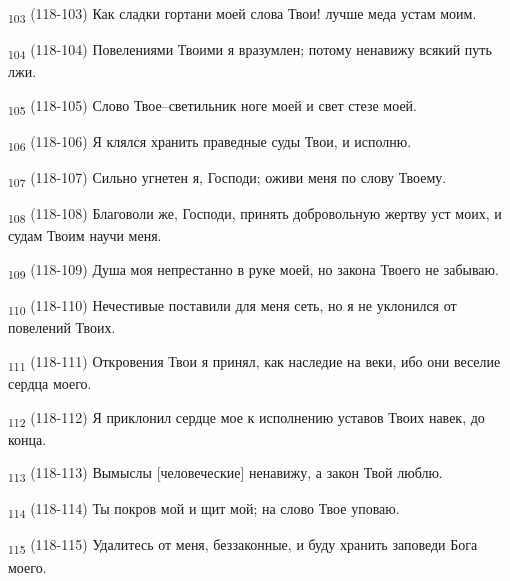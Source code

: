 \begin{tcolorbox}
\textsubscript{103} (118-103) Как сладки гортани моей слова Твои! лучше меда устам моим.
\end{tcolorbox}
\begin{tcolorbox}
\textsubscript{104} (118-104) Повелениями Твоими я вразумлен; потому ненавижу всякий путь лжи.
\end{tcolorbox}
\begin{tcolorbox}
\textsubscript{105} (118-105) Слово Твое--светильник ноге моей и свет стезе моей.
\end{tcolorbox}
\begin{tcolorbox}
\textsubscript{106} (118-106) Я клялся хранить праведные суды Твои, и исполню.
\end{tcolorbox}
\begin{tcolorbox}
\textsubscript{107} (118-107) Сильно угнетен я, Господи; оживи меня по слову Твоему.
\end{tcolorbox}
\begin{tcolorbox}
\textsubscript{108} (118-108) Благоволи же, Господи, принять добровольную жертву уст моих, и судам Твоим научи меня.
\end{tcolorbox}
\begin{tcolorbox}
\textsubscript{109} (118-109) Душа моя непрестанно в руке моей, но закона Твоего не забываю.
\end{tcolorbox}
\begin{tcolorbox}
\textsubscript{110} (118-110) Нечестивые поставили для меня сеть, но я не уклонился от повелений Твоих.
\end{tcolorbox}
\begin{tcolorbox}
\textsubscript{111} (118-111) Откровения Твои я принял, как наследие на веки, ибо они веселие сердца моего.
\end{tcolorbox}
\begin{tcolorbox}
\textsubscript{112} (118-112) Я приклонил сердце мое к исполнению уставов Твоих навек, до конца.
\end{tcolorbox}
\begin{tcolorbox}
\textsubscript{113} (118-113) Вымыслы [человеческие] ненавижу, а закон Твой люблю.
\end{tcolorbox}
\begin{tcolorbox}
\textsubscript{114} (118-114) Ты покров мой и щит мой; на слово Твое уповаю.
\end{tcolorbox}
\begin{tcolorbox}
\textsubscript{115} (118-115) Удалитесь от меня, беззаконные, и буду хранить заповеди Бога моего.
\end{tcolorbox}
